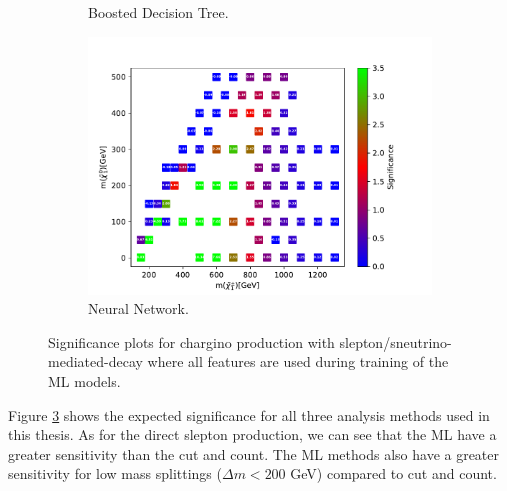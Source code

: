 \begin{figure}[H]
\begin{subfigure}[t!]{0.49\textwidth}
    \caption{Boosted Decision Tree.}
        \label{fig:signAllslepsnuBDT}
    \end{subfigure}      
    \begin{subfigure}[t!]{0.49\textwidth}
    \includegraphics[width = \textwidth]{Figures/Significances/significance_NN_slepsnu_All_level.pdf}
    \caption{Neural Network.}
        \label{fig:signAllslepsnuNN}
    \end{subfigure}
    \caption{Significance plots for chargino production with slepton/sneutrino-mediated-decay where all features are used during training of the ML models.}
    \label{fig:signAllslepsnu}
\end{figure}

Figure \ref{fig:signAllslepsnu} shows the expected significance for all three analysis methods used in this thesis. As for the direct slepton production, we can see that the ML have a greater sensitivity than the cut and count. The ML methods also have a greater sensitivity for low mass splittings ($\Delta m < 200$ GeV) compared to cut and count. 





























